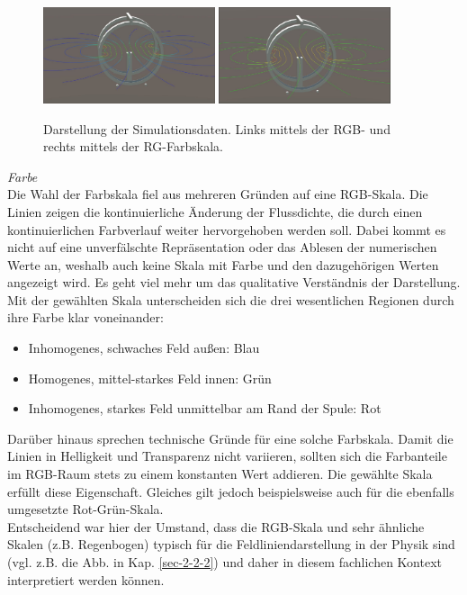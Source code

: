 \begin{figure}[h!]
	\centering
	\includegraphics[width=0.45\textwidth]{images/unity/simulation_rgb.jpg}
	\hspace{0.03\textwidth}
	\includegraphics[width=0.45\textwidth]{images/unity/simulation.jpg}
	\caption{Darstellung der Simulationsdaten. Links mittels der RGB- und rechts mittels der RG-Farbskala.}
	\label{img:mfield-simulation}
\end{figure}

\textit{Farbe}\\
Die Wahl der Farbskala fiel aus mehreren Gründen auf eine RGB-Skala. Die Linien zeigen die kontinuierliche Änderung der Flussdichte, die durch einen kontinuierlichen Farbverlauf weiter hervorgehoben werden soll. Dabei kommt es nicht auf eine unverfälschte Repräsentation oder das Ablesen der numerischen Werte an, weshalb auch keine Skala mit Farbe und den dazugehörigen Werten angezeigt wird. Es geht viel mehr um das qualitative Verständnis der Darstellung. Mit der gewählten Skala unterscheiden sich die drei wesentlichen Regionen durch ihre Farbe klar voneinander:
\begin{itemize}
	\setlength{\itemsep}{-1pt}
	\singlespacing
	\item Inhomogenes, schwaches Feld außen: Blau
	\item Homogenes, mittel-starkes Feld innen: Grün
	\item Inhomogenes, starkes Feld unmittelbar am Rand der Spule: Rot
\end{itemize}

Darüber hinaus sprechen technische Gründe für eine solche Farbskala. Damit die Linien in Helligkeit und Transparenz nicht variieren, sollten sich die Farbanteile im RGB-Raum stets zu einem konstanten Wert addieren. Die gewählte Skala erfüllt diese Eigenschaft. Gleiches gilt jedoch beispielsweise auch für die ebenfalls umgesetzte Rot-Grün-Skala.\\
\noindent\hspace*{5mm}
Entscheidend war hier der Umstand, dass die RGB-Skala und sehr ähnliche Skalen (z.B. Regenbogen) typisch für die Feldliniendarstellung in der Physik sind (vgl. z.B. die Abb. in Kap. \ref{sec-2-2-2}) und daher in diesem fachlichen Kontext interpretiert werden können.

